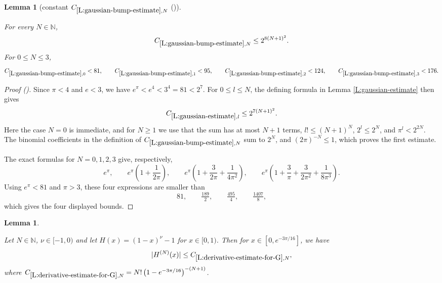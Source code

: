 \documentclass[12pt,reqno]{amsart}
\newcommand{\auto}{{({\tiny\faCar})}}
\theoremstyle{plain}
\newtheorem{lemma}[theorem]{Lemma}
\numberwithin{equation}{section}
\theoremstyle{remark}
\newcommand{\uses}[1]{}
\newcommand{\usesdefs}[1]{}
\newcommand{\leanok}{}
\newcommand{\lean}[1]{}
\newcommand{\N}{{\mathbb N}}
\begin{document}
\begin{lemma}[constant $C_{\ref{L:gaussian-bump-estimate},N}$ \auto]\label{constant gaussian bump estimate}\uses{L:gaussian-estimate,L:gaussian-bump-estimate}\usesdefs{}
\lean{Auto.constantGaussianBumpEstimate}
\leanok
For every $N\in\N$,
\begin{equation}\label{constant gaussian bump estimate bound}
C_{\ref{L:gaussian-bump-estimate},N}\le2^{8(N+1)^2}.
\end{equation}
For $0\le N\le3$,
\begin{equation}\label{auto:constant-gaussian-bump-estimate-small}
C_{\ref{L:gaussian-bump-estimate},0}<81,\qquad
C_{\ref{L:gaussian-bump-estimate},1}<95,\qquad
C_{\ref{L:gaussian-bump-estimate},2}<124,\qquad
C_{\ref{L:gaussian-bump-estimate},3}<176.
\end{equation}
\end{lemma}
\begin{proof}[Proof \auto]
Since $\pi<4$ and $e<3$, we have $e^\pi<e^4<3^4=81<2^7$. For $0\le l\le N$, the defining formula in Lemma \ref{L:gaussian-estimate} then gives
\[
C_{\ref{L:gaussian-estimate},l}\le2^{7(N+1)^2}.
\]
Here the case $N=0$ is immediate, and for $N\ge1$ we use that the sum has at most $N+1$ terms, $l!\le(N+1)^N$, $2^l\le2^N$, and $\pi^l<2^{2N}$. The binomial coefficients in the definition of $C_{\ref{L:gaussian-bump-estimate},N}$ sum to $2^N$, and $(2\pi)^{-N}\le1$, which proves the first estimate.

The exact formulas for $N=0,1,2,3$ give, respectively,
\[
e^\pi,
\qquad
e^\pi\left(1+\frac1{2\pi}\right),
\qquad
e^\pi\left(1+\frac3{2\pi}+\frac1{4\pi^2}\right),
\qquad
e^\pi\left(1+\frac3\pi+\frac3{2\pi^2}+\frac1{8\pi^3}\right).
\]
Using $e^\pi<81$ and $\pi>3$, these four expressions are smaller than
\[
81,\qquad \tfrac{189}{2},\qquad \tfrac{495}{4},\qquad \tfrac{1407}{8},
\]
which gives the four displayed bounds.
\end{proof}


\begin{lemma}\label{L:derivative-estimate-for-G}\uses{}\usesdefs{}
\lean{Auto.derivativeEstimateForG}
\leanok
Let $N\in \N$, $\nu\in [-1,0)$ and let $H(x)=(1-x)^{\nu}-1$ for $x\in [0,1)$. Then for $x\in [0,e^{-3\pi/16}]$, we have
\begin{equation}\label{auto:exponential-composition-derivative-bound}
|H^{(N)}(x)| \leq C_{\ref{L:derivative-estimate-for-G},N},
\end{equation}
where $C_{\ref{L:derivative-estimate-for-G},N}= N! \left(1 - e^{-3\pi/16}\right)^{-(N+1)}$.
\end{lemma}
\end{document}
